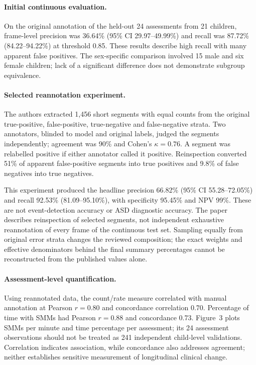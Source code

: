 \paragraph{Initial continuous evaluation.}
On the original annotation of the held-out 24 assessments from 21 children, frame-level precision was 36.64\% (95\% CI 29.97--49.99\%) and recall was 87.72\% (84.22--94.22\%) at threshold 0.85. These results describe high recall with many apparent false positives. The sex-specific comparison involved 15 male and six female children; lack of a significant difference does not demonstrate subgroup equivalence. \cite[p.~5]{barami2024}

\paragraph{Selected reannotation experiment.}
The authors extracted 1,456 short segments with equal counts from the original true-positive, false-positive, true-negative and false-negative strata. Two annotators, blinded to model and original labels, judged the segments independently; agreement was 90\% and Cohen's $\kappa=0.76$. A segment was relabelled positive if either annotator called it positive. Reinspection converted 51\% of apparent false-positive segments into true positives and 9.8\% of false negatives into true negatives. \cite[pp.~5--7]{barami2024}

This experiment produced the headline precision 66.82\% (95\% CI 55.28--72.05\%) and recall 92.53\% (81.09--95.10\%), with specificity 95.45\% and NPV 99\%. These are not event-detection accuracy or ASD diagnostic accuracy. The paper describes reinspection of selected segments, not independent exhaustive reannotation of every frame of the continuous test set. Sampling equally from original error strata changes the reviewed composition; the exact weights and effective denominators behind the final summary percentages cannot be reconstructed from the published values alone. \cite[p.~7]{barami2024}

\paragraph{Assessment-level quantification.}
Using reannotated data, the count/rate measure correlated with manual annotation at Pearson $r=0.80$ and concordance correlation 0.70. Percentage of time with SMMs had Pearson $r=0.88$ and concordance 0.73. Figure~3 plots SMMs per minute and time percentage per assessment; its 24 assessment observations should not be treated as 241 independent child-level validations. Correlation indicates association, while concordance also addresses agreement; neither establishes sensitive measurement of longitudinal clinical change. \cite[pp.~7--8]{barami2024}

